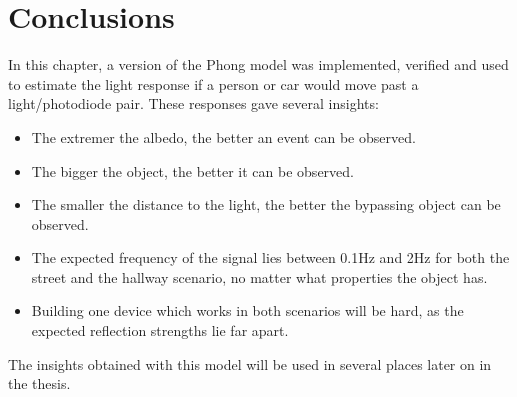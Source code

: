 \section{Conclusions}
In this chapter, a version of the Phong model was implemented, verified and used to estimate the light response if a person or car would move past a light/photodiode pair. These responses gave several insights:
\begin{itemize}[itemsep=-1ex,topsep=0pt]
	\item The extremer the albedo, the better an event can be observed.
	\item The bigger the object, the better it can be observed.
	\item The smaller the distance to the light, the better the bypassing object can be observed.
	\item The expected frequency of the signal lies between 0.1Hz and 2Hz for both the street and the hallway scenario, no matter what properties the object has.
	\item Building one device which works in both scenarios will be hard, as the expected reflection strengths lie far apart.

\end{itemize}
The insights obtained with this model will be used in several places later on in the thesis.